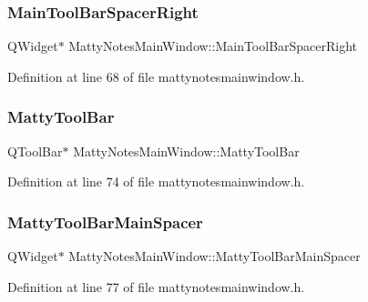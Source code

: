 \subsubsection{\texorpdfstring{Main\+Tool\+Bar\+Spacer\+Right}{MainToolBarSpacerRight}}
{\footnotesize\ttfamily Q\+Widget$\ast$ Matty\+Notes\+Main\+Window\+::\+Main\+Tool\+Bar\+Spacer\+Right\hspace{0.3cm}{\ttfamily [private]}}



Definition at line 68 of file mattynotesmainwindow.\+h.

\hypertarget{classMattyNotesMainWindow_a36941bdb55f9a9dabb1d8070f332f73d}{}\label{classMattyNotesMainWindow_a36941bdb55f9a9dabb1d8070f332f73d} 
\subsubsection{\texorpdfstring{Matty\+Tool\+Bar}{MattyToolBar}}
{\footnotesize\ttfamily Q\+Tool\+Bar$\ast$ Matty\+Notes\+Main\+Window\+::\+Matty\+Tool\+Bar\hspace{0.3cm}{\ttfamily [private]}}



Definition at line 74 of file mattynotesmainwindow.\+h.

\hypertarget{classMattyNotesMainWindow_acd86504db4060e59acb9e3e59b68c84c}{}\label{classMattyNotesMainWindow_acd86504db4060e59acb9e3e59b68c84c} 
\subsubsection{\texorpdfstring{Matty\+Tool\+Bar\+Main\+Spacer}{MattyToolBarMainSpacer}}
{\footnotesize\ttfamily Q\+Widget$\ast$ Matty\+Notes\+Main\+Window\+::\+Matty\+Tool\+Bar\+Main\+Spacer\hspace{0.3cm}{\ttfamily [private]}}



Definition at line 77 of file mattynotesmainwindow.\+h.

\hypertarget{classMattyNotesMainWindow_a385e70529a6b11059d15d79cdf7d7ef3}{}\label{classMattyNotesMainWindow_a385e70529a6b11059d15d79cdf7d7ef3} 
